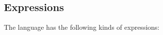 \documentclass[11pt]{article}
\newcommand{\mathsc}[1]{\bm{\mathsf{#1}}}
\newcommand{\typebool}{\ensuremath{\mathsc{bool}}\xspace}
\newcommand{\typeint}{\ensuremath{\mathsc{int}}\xspace}
\newcommand{\typefloat}{\ensuremath{\mathsc{float}}\xspace}
\newcommand{\typeref}[1]{\ensuremath{\mathsc{ref}~#1}\xspace}
\newcommand{\typefn}[2]{\ensuremath{(#1)\rightarrow #2}\xspace}
\begin{document}





\subsection{Expressions}

The language has the following kinds of expressions:
\end{document}
